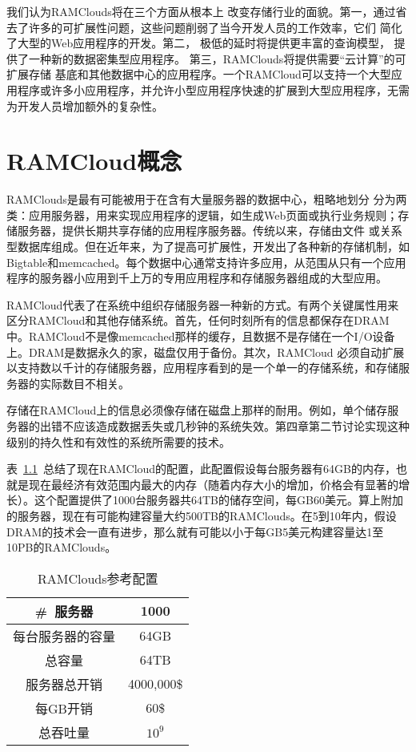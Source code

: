 \documentclass[translation]{zjutreport}
\begin{document}
我们认为RAMClouds将在三个方面从根本上
改变存储行业的面貌。第一，通过省去了许多的可扩展性问题，这些问题削弱了当今开发人员的工作效率，它们
简化了大型的Web应用程序的开发。第二，
极低的延时将提供更丰富的查询模型，
提供了一种新的数据密集型应用程序。
第三，RAMClouds将提供需要“云计算”的可扩展存储
基底和其他数据中心的应用程序。一个RAMCloud可以支持一个大型应用程序或许多小应用程序，并允许小型应用程序快速的扩展到大型应用程序，无需为开发人员增加额外的复杂性。


\chapter{RAMCloud概念}
RAMClouds是最有可能被用于在含有大量服务器的数据中心，粗略地划分
分为两类：应用服务器，用来实现应用程序的逻辑，如生成Web页面或执行业务规则；存储服务器，提供长期共享存储的应用程序服务器。传统以来，存储由文件
或关系型数据库组成。但在近年来，为了提高可扩展性，开发出了各种新的存储机制，如Bigtable和memcached。每个数据中心通常支持许多应用，从范围从只有一个应用程序的服务器小应用到千上万的专用应用程序和存储服务器组成的大型应用。

RAMCloud代表了在系统中组织存储服务器一种新的方式。有两个关键属性用来区分RAMCloud和其他存储系统。首先，任何时刻所有的信息都保存在DRAM中。RAMCloud不是像memcached那样的缓存，且数据不是存储在一个I/O设备上。DRAM是数据永久的家，磁盘仅用于备份。其次，RAMCloud
必须自动扩展以支持数以千计的存储服务器，应用程序看到的是一个单一的存储系统，和存储服务器的实际数目不相关。

存储在RAMCloud上的信息必须像存储在磁盘上那样的耐用。例如，单个储存服务器的出错不应该造成数据丢失或几秒钟的系统失效。第四章第二节讨论实现这种级别的持久性和有效性的系统所需要的技术。

表~\ref{tab:table1}~总结了现在RAMCloud的配置，此配置假设每台服务器有64GB的内存，也就是现在最经济有效范围内最大的内存（随着内存大小的增加，价格会有显著的增长）。这个配置提供了1000台服务器共64TB的储存空间，每GB60美元。算上附加的服务器，现在有可能构建容量大约500TB的RAMClouds。在5到10年内，假设DRAM的技术会一直有进步，那么就有可能以小于每GB5美元构建容量达1至10PB的RAMClouds。

\begin{table}[htbp]
\caption{RAMClouds参考配置}\label{tab:table1}
\vspace{0.5em}
\begin{center}
{\wuhao
\begin{tabular}{cc}
\toprule[1.5pt]
\#~服务器 & 1000\\
\midrule[1pt]
每台服务器的容量 & 64GB \\
总容量 & 64TB \\
服务器总开销 & 4000,000\$ \\
每GB开销 & 60\$ \\
总吞吐量 & $10^{9}$ \\
\bottomrule[1.5pt]
\end{tabular}}
\end{center}
\vspace{\baselineskip}
\end{table}
\end{document}
